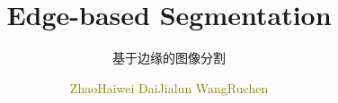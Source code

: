 \documentclass[notheorems,serif,table,compress]{beamer}  %
\begin{document}
\title{Edge-based Segmentation}
\subtitle{基于边缘的图像分割}
\author[]{\textcolor{olive}{ZhaoHaiwei DaiJialun WangRuchen}}
\frame{ \titlepage }
\def\hilite<#1>{\temporal<#1>{\color{blue!15}}{\color{black}}{\color{black}}}
\newcommand{\shadow}[2][purple]{\hskip5pt\shadowbox{\color{#1}\small \kai #2\vspace{3mm}}}
\newcommand{\colorrbox}[2][purple]{\doublebox{\color{#1}\small \kai#2}}

\end{document}
